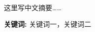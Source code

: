 \null\par
\begin{chineseabstract}

这里写中文摘要……





















    
\par\null\par\null\par %
\noindent \textbf{\heiti 关键词:} 关键词一，关键词二    %
\end{chineseabstract}
